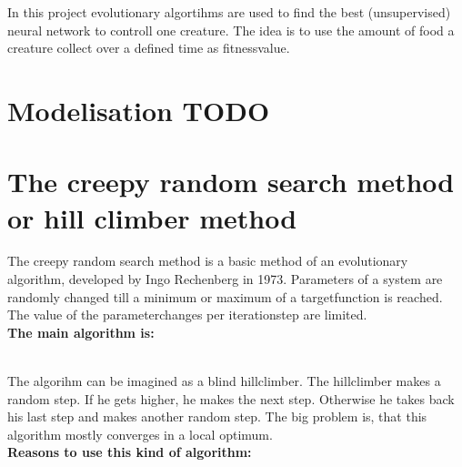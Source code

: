 \documentclass[10pt,a4paper,DIV=11]{scrreprt}
\begin{document}
In this project evolutionary algortihms are used to find the best 
(unsupervised) neural network to controll one creature. The idea is to use the amount of food a creature collect over a defined time as fitnessvalue.

\section{Modelisation TODO}

\section{The creepy random search method or hill climber method}
The creepy random search method is a basic method of an evolutionary algorithm, developed by Ingo Rechenberg in 1973. %
Parameters of a system are randomly changed till a minimum or maximum of a targetfunction is reached. The value of the parameterchanges per iterationstep are limited. \\

\textbf{The main algorithm is:}

 \\

The algorihm can be imagined as a blind hillclimber. The hillclimber makes a random step. If he gets higher, he makes the next step. Otherwise he takes back his last step and makes another random step. The big problem is, that this algorithm mostly converges in a local optimum. \\

\textbf{Reasons to use this kind of algorithm:}

   \\
\end{document}
